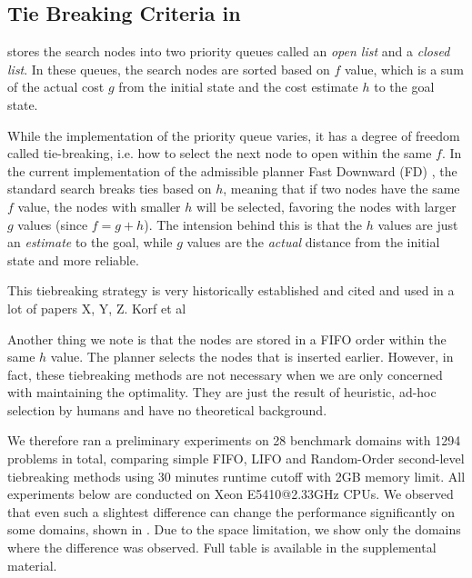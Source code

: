 
\subsection{Tie Breaking Criteria in \astar}


\astar stores the search nodes into two priority queues called an
\emph{open list} and a \emph{closed list}. In these queues, the search
nodes are sorted based on $f$ value, which is a sum of the actual cost
$g$ from the initial state and the cost estimate $h$ to the goal
state.

While the implementation of the priority queue varies, it has a degree
of freedom called tie-breaking, i.e. how to select the next node to open
within the same $f$.
In the current implementation of the \sota admissible planner Fast Downward (FD) \cite{Helmert2006}, the standard \astar search breaks ties based on $h$, meaning that if two nodes have the same $f$ value, the nodes with smaller $h$ will be selected, favoring the nodes with larger $g$ values (since $f=g+h$). The intension behind this is that the $h$ values are just an \emph{estimate} to the goal, while $g$ values are the \emph{actual} distance from the initial state and more reliable.

This tiebreaking strategy is very historically established and cited and
used in a lot of papers X, Y, Z.
Korf et al 

Another thing we note is that the nodes are stored in a FIFO order
within the same $h$ value. The planner selects the nodes that is inserted earlier. 
However, in fact, these tiebreaking methods are not necessary when we are only concerned with  maintaining the optimality. They are just the result of heuristic, ad-hoc selection by humans and have no theoretical background.

We therefore ran a preliminary experiments on 28 benchmark domains with
1294 problems in total, comparing simple FIFO, LIFO and Random-Order
second-level tiebreaking methods using 30 minutes runtime cutoff with
2GB memory limit.  All experiments below are conducted on Xeon
E5410@2.33GHz CPUs. We observed that even such a slightest difference
can change the performance significantly on some domains, shown in
. Due to the space limitation, we show only the
domains where the difference was observed. Full table is available in
the supplemental material.

